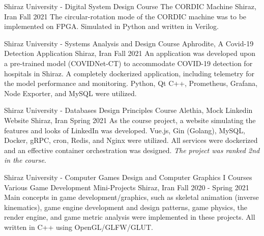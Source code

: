 

\begin{cventries}

  \cventry
    {Shiraz University - Digital System Design Course} %
    {The CORDIC Machine} %
    {Shiraz, Iran} %
    {Fall 2021} %
    {
      The circular-rotation mode of the CORDIC machine was to be implemented on FPGA. Simulated in Python and written in Verilog.
    }


  \cventry
    {Shiraz University - Systems Analysis and Design Course} %
    {Aphrodite, A Covid-19 Detection Application} %
    {Shiraz, Iran} %
    {Fall 2021} %
    {
      An application was developed upon a pre-trained model (COVIDNet-CT) to accommodate COVID-19 detection for hospitals in Shiraz. A completely dockerized application, including telemetry for the model performance and monitoring. Python, Qt C++, Prometheus, Grafana, Node Exporter, and MySQL were utilized.
    }

  \cventry
    {Shiraz University - Databases Design Principles Course} %
    {Alethia, Mock Linkedin Website} %
    {Shiraz, Iran} %
    {Spring 2021} %
    {
      As the course project, a website simulating the features and looks of LinkedIn was developed. Vue.js, Gin (Golang), MySQL, Docker, gRPC, cron, Redis, and Nginx were utilized. All services were dockerized and an effective container orchestration was designed. \emph{The project was ranked 2nd in the course}.
    }

  \cventry
    {Shiraz University - Computer Games Design and Computer Graphics I Courses} %
    {Various Game Development Mini-Projects} %
    {Shiraz, Iran} %
    {Fall 2020 - Spring 2021} %
    {
      Main concepts in game development/graphics, such as skeletal animation (inverse kinematics), game engine development and design patterns, game physics, the render engine, and game metric analysis were implemented in these projects. All written in C++ using OpenGL/GLFW/GLUT.
    }


\end{cventries}
